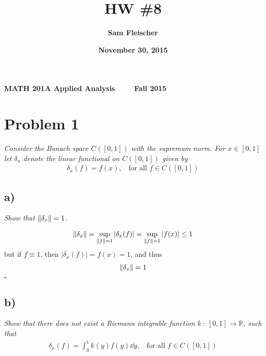 \documentclass[12pt]{article}
\title{\bf HW \#8}
\author{\bf Sam Fleischer}
\date{\bf November 30, 2015}
\theoremstyle{plain}
\begin{document}
\noindent\textbf{MATH 201A \hfill Applied Analysis \ \ \ \ \hfill Fall 2015} 

{\let\newpage\relax\maketitle}

\section*{Problem 1}
\emph{Consider the Banach space $C([0,1])$ with the supremum norm.  For $x \in [0,1]$ let $\delta_x$ denote the linear functional on $C([0,1])$ given by}
\begin{align*}
    \delta_x(f) = f(x),\ \ \ \ \text{for all } f \in C([0,1])
\end{align*}

\subsection*{ a)}
\emph{Show that $\norm{\delta_x} = 1$.}

\begin{align*}
    \norm{\delta_x} = \sup_{\norm{f} = 1}\left|\delta_x(f)\right| = \sup_{\norm{f} = 1} |f(x)| \leq 1
\end{align*}
but if $f \equiv 1$, then $|\delta_x(f)| = f(x) = 1$, and thus
\begin{align*}
    \norm{\delta_x} = 1
\end{align*}
\hfill $\square$

\subsection*{ b)}
\emph{Show that there does not exist a Riemann integrable function $k\ :\ [0,1] \rightarrow \mathbb{R}$, such that}
\begin{align*}
    \delta_x(f) = \int_0^1 k(y)f(y) \dd y,\ \ \ \ \text{for all } f \in C([0,1])
\end{align*}
\end{document}
